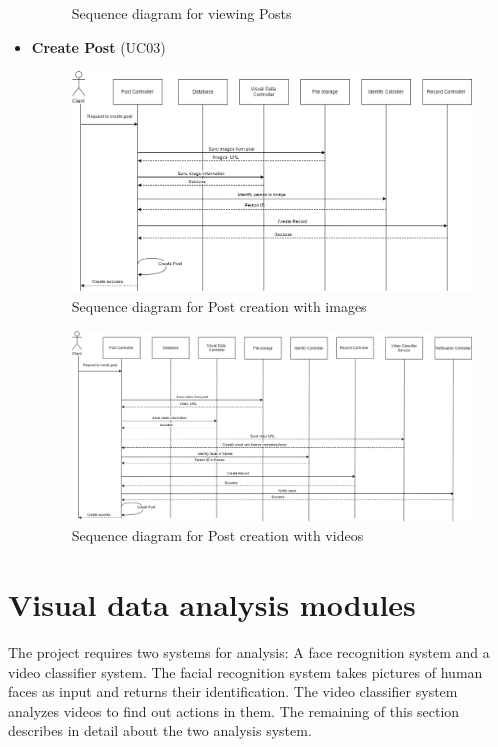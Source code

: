 \begin{itemize}
\begin{center}
\begin{figure}[H]
		\caption{Sequence diagram for viewing Posts}
		\end{figure}
	\end{center}
	\item \textbf{Create Post} (UC03)
	\begin{center}
		\begin{figure}[H]
		\centering
		\includegraphics[width=1\columnwidth]{images/chap4/createpost_sequence.png}
		\caption{Sequence diagram for Post creation with images}
		\end{figure}
	\end{center}
	\begin{center}
		\begin{figure}[H]
		\centering
		\includegraphics[width=1\columnwidth]{images/chap4/createpost_sequence_video.png}
		\caption{Sequence diagram for Post creation with videos}
		\end{figure}
	\end{center}

\end{itemize}

\section{Visual data analysis modules}
The project requires two systems for analysis: A face recognition system and a video classifier system. The facial recognition system takes pictures of human faces as input and returns their identification. The video classifier system analyzes videos to find out actions in them. The remaining of this section describes in detail about the two analysis system.
